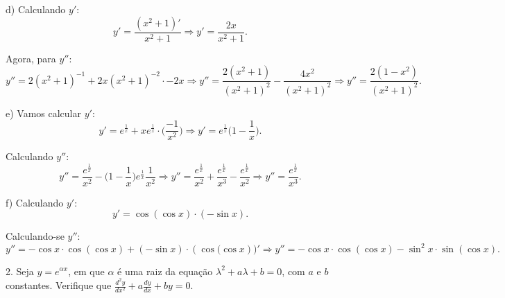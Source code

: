 \documentclass{article}
\begin{document}
{\begin{newpage}
\vspace{0.3cm}
d) Calculando $y'$:
\begin{equation*} y'=\displaystyle{\frac{(x^2 + 1)'}{x^2 + 1}   \Rightarrow y'=\frac{2x}{x^2 + 1}}.\end{equation*}
\par Agora, para $y''$:
\begin{equation*} y''=\displaystyle{2(x^2 + 1)^{-1} + 2x(x^2 + 1)^{-2}\cdot -2x \Rightarrow y''=\frac{2(x^2 + 1)}{(x^2 + 1)^2} - \frac{4x^2}{(x^2 + 1)^2} \Rightarrow y''= \frac{2(1 - x^2)}{(x^2 + 1)^2}} .\end{equation*}
\par
\vspace{0.3cm}
e) Vamos calcular $y'$:
\begin{equation*} y'=\displaystyle{e^{\frac{1}{x}} + xe^{\frac{1}{x}}\cdot\Big(\frac{-1}{x^2}\Big) \Rightarrow y'=e^{\frac{1}{x}}\Big( 1 - \frac{1}{x}\Big)}.\end{equation*}
\par Calculando $y''$:
\begin{equation*} y''=\displaystyle{\frac{e^{\frac{1}{x}}}{x^2} - \Big(1 - \frac{1}{x}\Big)e^{\frac{1}{x}}\frac{1}{x^2} \Rightarrow y''= \frac{e^{\frac{1}{x}}}{x^2} + \frac{e^{\frac{1}{x}}}{x^3} - \frac{e^{\frac{1}{x}}}{x^2} \Rightarrow y''=\frac{e^{\frac{1}{x}}}{x^3}} .\end{equation*}
\par
\vspace{0.3cm}
f) Calculando $y'$:
\begin{equation*} y'=\cos{(\cos{x})}\cdot (-\sin{x}) . \end{equation*}
\par Calculando-se $y''$:
\begin{equation*} y''=-\cos{x}\cdot\cos{(\cos{x})} + (-\sin{x})\cdot (\cos{(\cos{x}}))' \Rightarrow y''=-\cos{x}\cdot\cos{(\cos{x})} - \sin^{2}{x}\cdot\sin{(\cos{x})} .\end{equation*}
\par
\vspace{0.3cm}
\begin{flushleft}
2. Seja $y=e^{\alpha x}$, em que $\alpha $ é uma raiz da equação $\lambda^{2} + a\lambda + b = 0$, com $a$ e $b$ constantes. Verifique que $\displaystyle{\frac{d^{2}y}{dx^2} + a\frac{dy}{dx} + by = 0}$.
\end{flushleft}
\par
\vspace{0.3cm}
\begin{flushleft}

\end{flushleft}
\end{newpage}}
\end{document}
